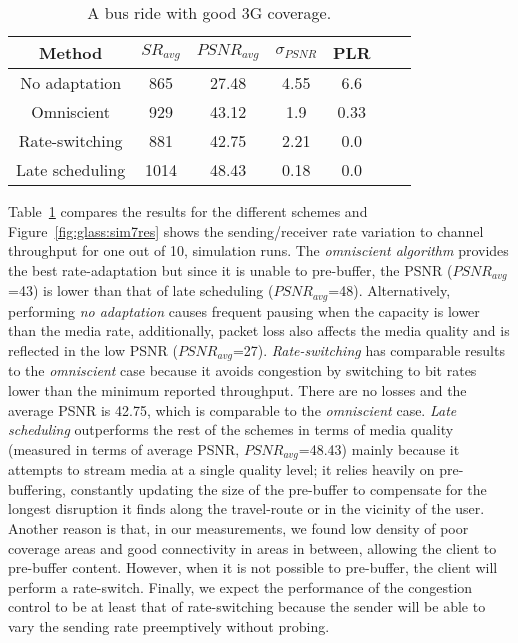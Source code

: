\begin{table}
  \begin{center}
\begin{tabular}{ccccccc} \hline
Method & $SR_{avg}$ & $PSNR_{avg}$ & $\sigma_{PSNR}$ & PLR \\ \hline
No adaptation   & 865   & 27.48 & 4.55  & 6.6 \\
Omniscient      & 929   & 43.12 & 1.9   & 0.33 \\
Rate-switching  & 881   & 42.75 & 2.21  & 0.0  \\
Late scheduling & 1014  & 48.43 & 0.18 & 0.0  \\ \hline
\end{tabular}
\caption{A bus ride with good 3G coverage.}
\label{table-glass-sim7res}
\end{center}
\end{table}


Table~\ref{table-glass-sim7res} compares the results for the different schemes
and Figure~\ref{fig:glass:sim7res} shows the sending/receiver rate variation
to channel throughput for one out of 10, simulation runs. The \emph{omniscient
algorithm} provides the best rate-adaptation but since it is unable to
pre-buffer, the PSNR ($PSNR_{avg}$=43) is lower than that of late scheduling
($PSNR_{avg}$=48). Alternatively, performing \emph{no adaptation} causes
frequent pausing when the capacity is lower than the media rate, additionally,
packet loss also affects the media quality and is reflected in the low PSNR
($PSNR_{avg}$=27). \emph{Rate-switching} has comparable results to the
\emph{omniscient} case because it avoids congestion by switching to bit rates
lower than the minimum reported throughput. There are no losses and the average
PSNR is 42.75, which is comparable to the \emph{omniscient} case. \emph{Late
scheduling} outperforms the rest of the schemes in terms of media quality
(measured in terms of average PSNR, $PSNR_{avg}$=48.43) mainly because it
attempts to stream media at a single quality level; it relies heavily on
pre-buffering, constantly updating the size of the pre-buffer to compensate for
the longest disruption it finds along the travel-route or in the vicinity of
the user. Another reason is that, in our measurements, we found low density of
poor coverage areas and good connectivity in areas in between, allowing the
client to pre-buffer content. However, when it is not possible to pre-buffer,
the client will perform a rate-switch. Finally, we expect the performance of
the congestion control to be at least that of rate-switching because the
sender will be able to vary the sending rate preemptively without probing.

